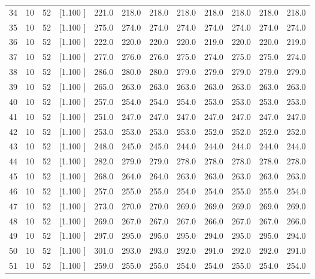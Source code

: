 \documentclass[12pt,a4paper]{article}
\begin{document}
\begin{center}
{\begin{tabular}{r r r r r r r r r r r r}
  34& 10& 52&[1.100     ]&   221.0&   218.0&   218.0&   218.0&   218.0&   218.0&   218.0&   218.0\\[-0.02in]
  35& 10& 52&[1.100     ]&   275.0&   274.0&   274.0&   274.0&   274.0&   274.0&   274.0&   274.0\\[-0.02in]
  36& 10& 52&[1.100     ]&   222.0&   220.0&   220.0&   220.0&   219.0&   220.0&   220.0&   219.0\\[-0.02in]
  37& 10& 52&[1.100     ]&   277.0&   276.0&   276.0&   275.0&   274.0&   275.0&   275.0&   274.0\\[-0.02in]
  38& 10& 52&[1.100     ]&   286.0&   280.0&   280.0&   279.0&   279.0&   279.0&   279.0&   279.0\\[-0.02in]
  39& 10& 52&[1.100     ]&   265.0&   263.0&   263.0&   263.0&   263.0&   263.0&   263.0&   263.0\\[-0.02in]
  40& 10& 52&[1.100     ]&   257.0&   254.0&   254.0&   254.0&   253.0&   253.0&   253.0&   253.0\\[-0.02in]
  41& 10& 52&[1.100     ]&   251.0&   247.0&   247.0&   247.0&   247.0&   247.0&   247.0&   247.0\\[-0.02in]
  42& 10& 52&[1.100     ]&   253.0&   253.0&   253.0&   253.0&   252.0&   252.0&   252.0&   252.0\\[-0.02in]
  43& 10& 52&[1.100     ]&   248.0&   245.0&   245.0&   244.0&   244.0&   244.0&   244.0&   244.0\\[-0.02in]
  44& 10& 52&[1.100     ]&   282.0&   279.0&   279.0&   278.0&   278.0&   278.0&   278.0&   278.0\\[-0.02in]
  45& 10& 52&[1.100     ]&   268.0&   264.0&   264.0&   263.0&   263.0&   263.0&   263.0&   263.0\\[-0.02in]
  46& 10& 52&[1.100     ]&   257.0&   255.0&   255.0&   254.0&   254.0&   255.0&   255.0&   254.0\\[-0.02in]
  47& 10& 52&[1.100     ]&   273.0&   270.0&   270.0&   269.0&   269.0&   269.0&   269.0&   269.0\\[-0.02in]
  48& 10& 52&[1.100     ]&   269.0&   267.0&   267.0&   267.0&   266.0&   267.0&   267.0&   266.0\\[-0.02in]
  49& 10& 52&[1.100     ]&   297.0&   295.0&   295.0&   295.0&   294.0&   295.0&   295.0&   294.0\\[-0.02in]
  50& 10& 52&[1.100     ]&   301.0&   293.0&   293.0&   292.0&   291.0&   292.0&   292.0&   291.0\\[-0.02in]
  51& 10& 52&[1.100     ]&   259.0&   255.0&   255.0&   254.0&   254.0&   255.0&   254.0&   254.0\\[-0.02in]

\end{tabular}}
\end{center}
\end{document}
